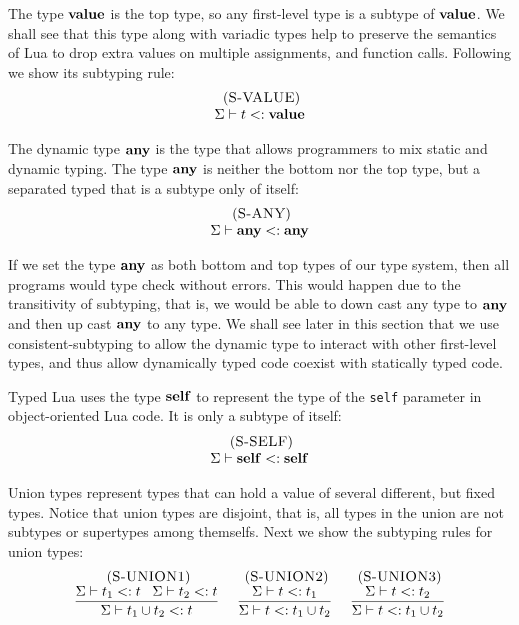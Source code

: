 The type $\mathbf{value}$ is the top type, so any first-level type is a
subtype of $\mathbf{value}$.
We shall see that this type along with variadic types help to
preserve the semantics of Lua to drop extra values on multiple
assignments, and function calls.
Following we show its subtyping rule:
\[
\begin{array}{c}
\; (\textsc{S-VALUE})\\
\Sigma \vdash t <: \mathbf{value}
\end{array}
\]

The dynamic type $\mathbf{any}$ is the type that allows programmers to mix
static and dynamic typing.
The type $\mathbf{any}$ is neither the bottom nor the top type, but a
separated typed that is a subtype only of itself:
\[
\begin{array}{c}
\; (\textsc{S-ANY})\\
\Sigma \vdash \mathbf{any} <: \mathbf{any}
\end{array}
\]

If we set the type $\mathbf{any}$ as both bottom and top types of our type
system, then all programs would type check without errors.
This would happen due to the transitivity of subtyping, that is,
we would be able to down cast any type to $\mathbf{any}$ and then up cast
$\mathbf{any}$ to any type.
We shall see later in this section that we use consistent-subtyping
to allow the dynamic type to interact with other first-level types,
and thus allow dynamically typed code coexist with statically typed
code.

Typed Lua uses the type $\mathbf{self}$ to represent the type of the \texttt{self}
parameter in object-oriented Lua code.
It is only a subtype of itself:
\[
\begin{array}{c}
\; (\textsc{S-SELF})\\
\Sigma \vdash \mathbf{self} <: \mathbf{self}
\end{array}
\]

Union types represent types that can hold a value of several
different, but fixed types.
Notice that union types are disjoint, that is, all types in
the union are not subtypes or supertypes among themselfs.
Next we show the subtyping rules for union types:
\[
\begin{array}{c}
\begin{array}{c}
\; (\textsc{S-UNION1})\\
\dfrac{\Sigma \vdash t_{1} <: t \;\;\;
       \Sigma \vdash t_{2} <: t}
      {\Sigma \vdash t_{1} \cup t_{2} <: t}
\end{array}
\;
\begin{array}{c}
\; (\textsc{S-UNION2})\\
\dfrac{\Sigma \vdash t <: t_{1}}
      {\Sigma \vdash t <: t_{1} \cup t_{2}}
\end{array}
\;
\begin{array}{c}
\; (\textsc{S-UNION3})\\
\dfrac{\Sigma \vdash t <: t_{2}}
      {\Sigma \vdash t <: t_{1} \cup t_{2}}
\end{array}
\end{array}
\]

